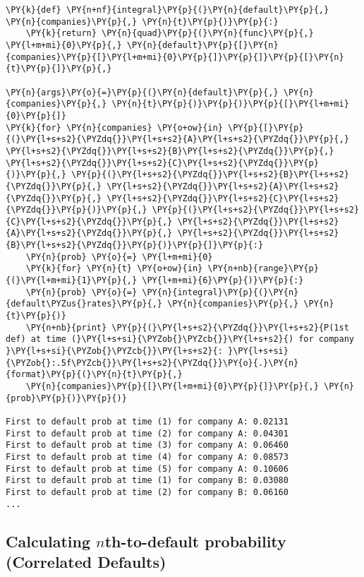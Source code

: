 \begin{tcolorbox}[breakable, size=fbox, boxrule=1pt, pad at break*=1mm,colback=cellbackground, colframe=cellborder]
\begin{Verbatim}[commandchars=\\\{\}]
\PY{k}{def} \PY{n+nf}{integral}\PY{p}{(}\PY{n}{default}\PY{p}{,} \PY{n}{companies}\PY{p}{,} \PY{n}{t}\PY{p}{)}\PY{p}{:}
    \PY{k}{return} \PY{n}{quad}\PY{p}{(}\PY{n}{func}\PY{p}{,} \PY{l+m+mi}{0}\PY{p}{,} \PY{n}{default}\PY{p}{[}\PY{n}{companies}\PY{p}{[}\PY{l+m+mi}{0}\PY{p}{]}\PY{p}{]}\PY{p}{[}\PY{n}{t}\PY{p}{]}\PY{p}{,} 

\PY{n}{args}\PY{o}{=}\PY{p}{(}\PY{n}{default}\PY{p}{,} \PY{n}{companies}\PY{p}{,} \PY{n}{t}\PY{p}{)}\PY{p}{)}\PY{p}{[}\PY{l+m+mi}{0}\PY{p}{]}
\PY{k}{for} \PY{n}{companies} \PY{o+ow}{in} \PY{p}{[}\PY{p}{(}\PY{l+s+s2}{\PYZdq{}}\PY{l+s+s2}{A}\PY{l+s+s2}{\PYZdq{}}\PY{p}{,} \PY{l+s+s2}{\PYZdq{}}\PY{l+s+s2}{B}\PY{l+s+s2}{\PYZdq{}}\PY{p}{,} \PY{l+s+s2}{\PYZdq{}}\PY{l+s+s2}{C}\PY{l+s+s2}{\PYZdq{}}\PY{p}{)}\PY{p}{,} \PY{p}{(}\PY{l+s+s2}{\PYZdq{}}\PY{l+s+s2}{B}\PY{l+s+s2}{\PYZdq{}}\PY{p}{,} \PY{l+s+s2}{\PYZdq{}}\PY{l+s+s2}{A}\PY{l+s+s2}{\PYZdq{}}\PY{p}{,} \PY{l+s+s2}{\PYZdq{}}\PY{l+s+s2}{C}\PY{l+s+s2}{\PYZdq{}}\PY{p}{)}\PY{p}{,} \PY{p}{(}\PY{l+s+s2}{\PYZdq{}}\PY{l+s+s2}{C}\PY{l+s+s2}{\PYZdq{}}\PY{p}{,} \PY{l+s+s2}{\PYZdq{}}\PY{l+s+s2}{A}\PY{l+s+s2}{\PYZdq{}}\PY{p}{,} \PY{l+s+s2}{\PYZdq{}}\PY{l+s+s2}{B}\PY{l+s+s2}{\PYZdq{}}\PY{p}{)}\PY{p}{]}\PY{p}{:}
    \PY{n}{prob} \PY{o}{=} \PY{l+m+mi}{0}
    \PY{k}{for} \PY{n}{t} \PY{o+ow}{in} \PY{n+nb}{range}\PY{p}{(}\PY{l+m+mi}{1}\PY{p}{,} \PY{l+m+mi}{6}\PY{p}{)}\PY{p}{:}
    \PY{n}{prob} \PY{o}{=} \PY{n}{integral}\PY{p}{(}\PY{n}{default\PYZus{}rates}\PY{p}{,} \PY{n}{companies}\PY{p}{,} \PY{n}{t}\PY{p}{)}
    \PY{n+nb}{print} \PY{p}{(}\PY{l+s+s2}{\PYZdq{}}\PY{l+s+s2}{P(1st def) at time (}\PY{l+s+si}{\PYZob{}\PYZcb{}}\PY{l+s+s2}{) for company }\PY{l+s+si}{\PYZob{}\PYZcb{}}\PY{l+s+s2}{: }\PY{l+s+si}{\PYZob{}:.5f\PYZcb{}}\PY{l+s+s2}{\PYZdq{}}\PY{o}{.}\PY{n}{format}\PY{p}{(}\PY{n}{t}\PY{p}{,} 
    \PY{n}{companies}\PY{p}{[}\PY{l+m+mi}{0}\PY{p}{]}\PY{p}{,} \PY{n}{prob}\PY{p}{)}\PY{p}{)}

First to default prob at time (1) for company A: 0.02131
First to default prob at time (2) for company A: 0.04301
First to default prob at time (3) for company A: 0.06460
First to default prob at time (4) for company A: 0.08573
First to default prob at time (5) for company A: 0.10606
First to default prob at time (1) for company B: 0.03080
First to default prob at time (2) for company B: 0.06160
...
\end{Verbatim}
\end{tcolorbox}

\subsection{Calculating $n$th-to-default probability (Correlated Defaults)}\label{correlated-defaults}

